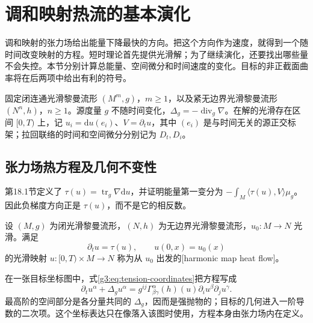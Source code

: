 
% 
% 

\section{调和映射热流的基本演化}
\label{g3:sec:2603}

调和映射的张力场给出能量下降最快的方向。把这个方向作为速度，就得到一个随时间改变映射的方程。短时理论首先提供光滑解；为了继续演化，还要找出哪些量不会失控。本节分别计算总能量、空间微分和时间速度的变化。目标的非正截面曲率将在后两项中给出有利的符号。

固定闭连通光滑黎曼流形 \((M^m,g)\)，\(m\ge1\)，以及紧无边界光滑黎曼流形 \((N^n,h)\)，\(n\ge1\)。源度量 \(g\) 不随时间变化，\(\Delta_g=-\operatorname{div}_g\nabla\)。在解的光滑存在区间 \([0,T)\) 上，记 \(u_i=\mathrm du(e_i)\)、\(V=\partial_tu\)，其中 \((e_i)\) 是与时间无关的源正交标架；拉回联络的时间和空间微分分别记为 \(D_t,D_i\)。

\subsection{张力场热方程及几何不变性}
\label{g3:subsec:2603:01}
第18.1节定义了 \(\tau(u)=\operatorname{tr}_g\nabla\mathrm du\)，并证明能量第一变分为 \(-\int_M\langle\tau(u),V\rangle\mu_g\)。因此负梯度方向正是 \(\tau(u)\)，而不是它的相反数。

\begin{definition}\label{g3:def:harmonic-map-heat-flow}
	设 \((M,g)\) 为闭光滑黎曼流形，\((N,h)\) 为无边界光滑黎曼流形，\(u_0:M\to N\) 光滑。满足
	\begin{equation}\label{g3:eq:harmonic-map-heat-flow}
		\partial_tu=\tau(u),\qquad u(0,x)=u_0(x)
	\end{equation}
	的光滑映射 \(u:[0,T)\times M\to N\) 称为从 \(u_0\) 出发的[harmonic map heat flow]。
\end{definition}

在一张目标坐标图中，式\eqref{g3:eq:tension-coordinates}把方程写成
\begin{equation}\label{g3:eq:harmonic-heat-local-equation}
	\partial_tu^\alpha+\Delta_g u^\alpha
	=g^{ij}\Gamma^\alpha_{\beta\gamma}(h)(u)
	\partial_i u^\beta\partial_j u^\gamma.
\end{equation}
最高阶的空间部分是各分量共同的 \(\Delta_g\)，因而是强抛物的；目标的几何进入一阶导数的二次项。这个坐标表达只在像落入该图时使用，方程本身由张力场内在定义。


